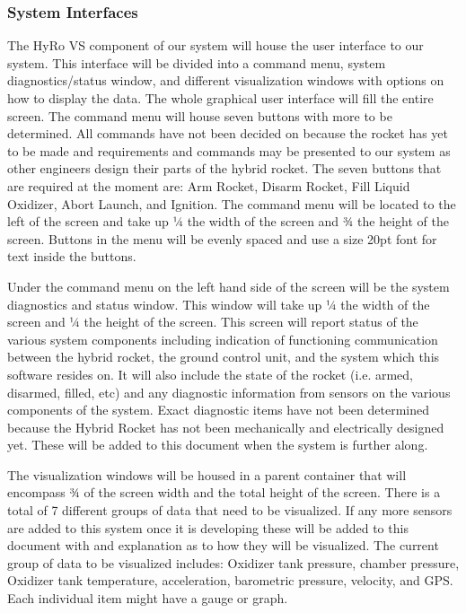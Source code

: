 \documentclass[10pt,draftclsnofoot,onecolumn,compsoc]{IEEEtran}
\begin{document}
\subsubsection{System Interfaces}
The HyRo VS component of our system will house the user interface to our system. This interface will be divided into a command menu, system diagnostics/status window, and different visualization windows with options on how to display the data. The whole graphical user interface will fill the entire screen. The command menu will house seven buttons with more to be determined. All commands have not been decided on because the rocket has yet to be made and requirements and commands may be presented to our system as other engineers design their parts of the hybrid rocket.  The seven buttons that are required at the moment are: Arm Rocket, Disarm Rocket, Fill Liquid Oxidizer, Abort Launch, and Ignition. The command menu will be located to the left of the screen and take up ¼ the width of the screen and ¾ the height of the screen. Buttons in the menu will be evenly spaced and use a size 20pt font for text inside the buttons. \par
	Under the command menu on the left hand side of the screen will be the system diagnostics and status window. This window will take up ¼ the width of the screen and ¼ the height of the screen. This screen will report status of the various system components including indication of functioning communication between the hybrid rocket, the ground control unit, and the system which this software resides on. It will also include the state of the rocket (i.e. armed, disarmed, filled, etc) and any diagnostic information from sensors on the various components of the system. Exact diagnostic items have not been determined because the Hybrid Rocket has not been mechanically and electrically designed yet. These will be added to this document when the system is further along.\par
	The visualization windows will be housed in a parent container that will encompass ¾ of the screen width and the total height of the screen. There is a total of 7 different groups of data that need to be visualized.  If any more sensors are added to this system once it is developing these will be added to this document with and explanation as to how they will be visualized.  The current group of data to be visualized includes:  Oxidizer tank pressure, chamber pressure, Oxidizer tank temperature, acceleration, barometric pressure, velocity, and GPS.   Each individual item might have a gauge or graph.\par
	
\end{document}
